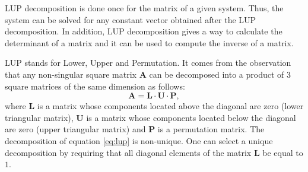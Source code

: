 LUP decomposition is done once for the matrix of a given system.
Thus, the system can be solved for any constant vector obtained
after the LUP decomposition. In addition, LUP decomposition gives
a way to calculate the determinant of a matrix and it can be used
to compute the inverse of a matrix.

LUP stands for Lower, Upper and Permutation. It comes from the
observation that any non-singular square matrix $\textbf{A}$ can be
decomposed into a product of 3 square matrices of the same
dimension as follows:
\begin{equation}
\label{eq:lup}
  \textbf{A}=\textbf{L}\cdot\textbf{U}\cdot\textbf{P},
\end{equation}
where ${\textbf{L}}$ is a matrix whose components located above the
diagonal are zero (lower triangular matrix), ${\textbf{U}}$ is a matrix
whose components located below the diagonal are zero (upper
triangular matrix) and ${\textbf{P}}$ is a permutation matrix. The
decomposition of equation \ref{eq:lup} is non-unique. One can
select a unique decomposition by requiring that all diagonal
elements of the matrix ${\textbf{L}}$ be equal to $1$.

